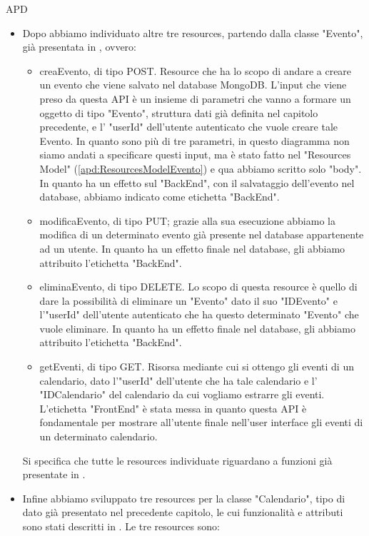 \begin{listaPersonale} {APD}
\begin{listaPersonale2}[APD]{}
\begin{itemize}
\begin{itemize}
                  \end{itemize}
            \item Dopo abbiamo individuato altre tre resources, partendo dalla classe "Evento", già presentata in , ovvero:
                  \begin{itemize}
                      \item creaEvento, di tipo POST. Resource che ha lo scopo di andare a creare un evento che viene salvato nel database MongoDB. L'input che viene preso da questa API è un insieme di parametri che vanno a formare un oggetto di tipo "Evento", struttura dati già definita nel capitolo precedente, e l' "userId" dell'utente autenticato che vuole creare tale Evento. In quanto sono più di tre parametri, in questo diagramma non siamo andati a specificare questi input, ma è stato fatto nel "Resources Model" (\ref{apd:ResourcesModelEvento}) e qua abbiamo scritto solo "body". In quanto ha un effetto sul "BackEnd", con il salvataggio dell'evento nel database, abbiamo indicato come etichetta "BackEnd".
                      \item modificaEvento, di tipo PUT; grazie alla sua esecuzione abbiamo la modifica di un determinato evento già presente nel database appartenente ad un utente. In quanto ha un effetto finale nel database, gli abbiamo attribuito l'etichetta "BackEnd".
                      \item eliminaEvento, di tipo DELETE. Lo scopo di questa resource è quello di dare la possibilità di eliminare un "Evento" dato il suo "IDEvento" e l'"userId" dell'utente autenticato che ha questo determinato "Evento" che vuole eliminare. In quanto ha un effetto finale nel database, gli abbiamo attribuito l'etichetta "BackEnd".
                      \item getEventi, di tipo GET. Risorsa mediante cui si ottengo gli eventi di un calendario, dato l'"userId" dell'utente che ha tale calendario e l' "IDCalendario" del calendario da cui vogliamo estrarre gli eventi. L'etichetta "FrontEnd" è stata messa in quanto questa API è fondamentale per mostrare all'utente finale nell'user interface gli eventi di un determinato calendario.
                  \end{itemize}
                  Si specifica che tutte le resources individuate riguardano a funzioni già presentate in .
            \item Infine abbiamo sviluppato tre resources per la classe "Calendario", tipo di dato già presentato nel precedente capitolo, le cui funzionalità e attributi sono stati descritti in . Le tre resources sono:

\end{itemize}
\end{listaPersonale2}
\end{listaPersonale}
